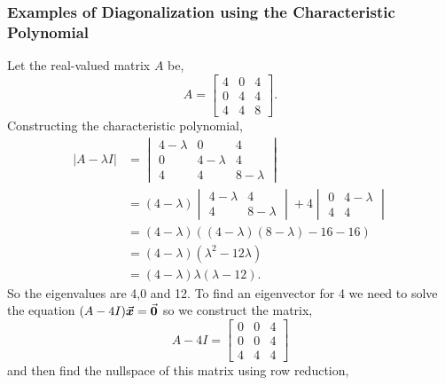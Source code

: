 \documentclass[MathsNotesBase.tex]{subfiles}
\begin{document}
{		
		\bigskip
		\subsubsection{Examples of Diagonalization using the Characteristic Polynomial}
		\begin{exe}
			\item{Let the real-valued matrix $A$ be,
				\[ A = \begin{bmatrix}
						4 & 0 & 4\\
						0 & 4 & 4\\
						4 & 4 & 8
						\end{bmatrix}.
				\]
				Constructing the characteristic polynomial,
				\begin{align*}
				\lvert{A - \lambda I}\rvert &= \begin{vmatrix}
													4 - \lambda & 0 & 4\\
													0 & 4 - \lambda & 4\\
													4 & 4 & 8 - \lambda
													\end{vmatrix} \\
				&= (4 - \lambda)\begin{vmatrix}4 - \lambda & 4\\4 & 8 - \lambda\end{vmatrix} + 
										4\begin{vmatrix}0 & 4 - \lambda\\4 & 4\end{vmatrix} \\
				&= (4 - \lambda)((4 - \lambda)(8 - \lambda) - 16 - 16)\\
				&= (4 - \lambda)(\lambda^2 - 12\lambda)\\
				&= (4 - \lambda)\lambda(\lambda - 12).
				\end{align*}
				So the eigenvalues are 4,0 and 12. To find an eigenvector for 4 we need to solve the equation ${ (A - 4I)\vec{\bm{x}} = \vec{\bm{0}} }$ so we construct the matrix,
				\[ A - 4I = \begin{bmatrix}
							0 & 0 & 4\\
							0 & 0 & 4\\
							4 & 4 & 4
							\end{bmatrix}
				\]
				and then find the nullspace of this matrix using row reduction,
				
}
\end{exe}}
\end{document}
